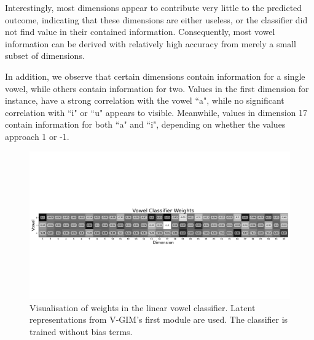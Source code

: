		Interestingly, most dimensions appear to contribute very little to the predicted outcome, indicating that these dimensions are either useless, or the classifier did not find value in their contained information. Consequently, most vowel information can be derived with relatively high accuracy from merely a small subset of dimensions. 
		
		In addition, we observe that certain dimensions contain information for a single vowel, while others contain information for two. Values in the first dimension for instance, have a strong correlation with the vowel ``a", while no significant correlation with ``i" or ``u" appears to visible. Meanwhile, values in dimension 17 contain information for both ``a" and ``i", depending on whether the values approach 1 or -1.
		
		
	\begin{figure}
		\centering
		\includegraphics[width=1\linewidth, trim={0 10cm 0 10cm}, clip]{graphs/vowel_classifier_weights}
		\caption{
			Visualisation of weights in the linear vowel classifier. Latent representations from V-GIM's first module are used. The classifier is trained without bias terms.
		}
		\label{fig:vowelclassifierweights}
	\end{figure}
	
	
	
	
		
		
		

